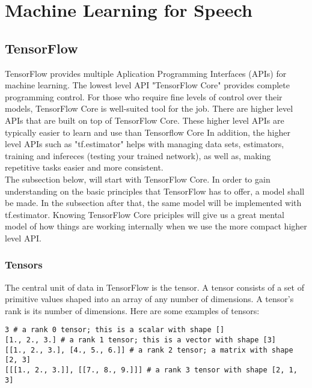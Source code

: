 \chapter{Machine Learning for Speech}\label{ch:machine_learning}

\section{TensorFlow}
TensorFlow provides multiple Aplication Programming Interfaces (APIs) for machine learning. The lowest level API "TensorFlow Core" provides complete programming control. For those who require fine levels of control over their models, TensorFlow Core is well-suited tool for the job. There are higher level APIs that are built on top of TensorFlow Core. These higher level APIs are typically easier to learn and use than Tensorflow Core  In addition, the higher level APIs such as "tf.estimator" helps with managing data sets, estimators, training and infereces (testing your trained network), as well as, making repetitive tasks easier and more consistent.\\

The subsection below, will start with TensorFlow Core. In order to gain understanding on the basic principles that TensorFlow has to offer, a model shall be made. In the subsection after that, the same model will be implemented with tf.estimator. Knowing TensorFlow Core priciples will give us a great mental model of how things are working internally when we use the more compact higher level API.

\subsection{Tensors}
The central unit of data in TensorFlow is the tensor. A tensor consists of a set of primitive values shaped into an array of any number of dimensions. A tensor's rank is its number of dimensions. Here are some examples of tensors:

\begin{lstlisting}
3 # a rank 0 tensor; this is a scalar with shape []
[1., 2., 3.] # a rank 1 tensor; this is a vector with shape [3]
[[1., 2., 3.], [4., 5., 6.]] # a rank 2 tensor; a matrix with shape [2, 3]
[[[1., 2., 3.]], [[7., 8., 9.]]] # a rank 3 tensor with shape [2, 1, 3]
\end{lstlisting}

